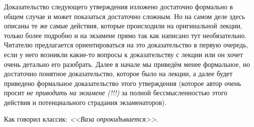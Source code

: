 Доказательство следующего утверждения изложено достаточно формально в общем случае и может показаться достаточно сложным. 
Но на самом деле здесь описаны те же самые действия, которые происходили на оригинальной лекции, только более подробно и на экзамене прямо так как написано тут необязательно.
Читателю предлагается ориентироваться на это доказательство в первую очередь, если у него возникли какие-то вопросы к доказательству с лекции или он хочет очень детально его разобрать. 
Далее в начале мы приведём менее формальное, но достаточно понятное доказательство, которое было на лекции, а далее будет приведено формальное доказательство этого утверждения (которое автор очень просит \textit{не приводить на экзамене (!!!)} за полной бессмысленностью этого действия и потенциального страдания экзаменаторов).

Как говорил классик: \textit{<<Ваза опрокидывается>>}.

